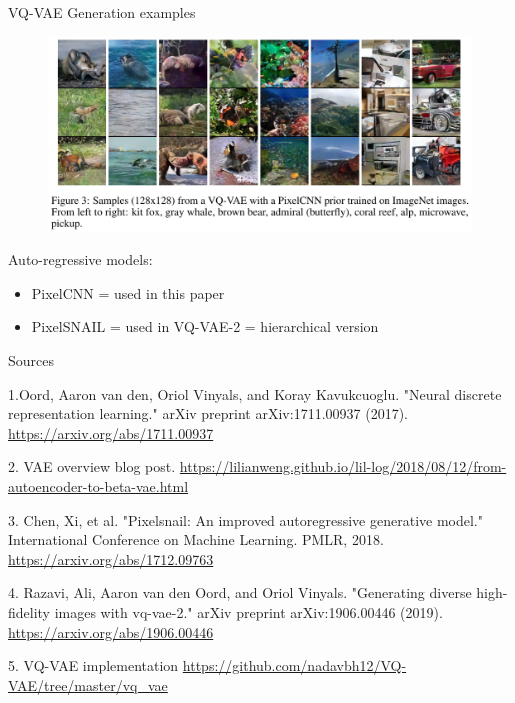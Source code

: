 \documentclass{beamer}
\begin{document}
\begin{frame}{VQ-VAE Generation examples}

\begin{figure}[h]
\includegraphics[width=\textwidth]{img/generated}
\end{figure}

Auto-regressive models:
\begin{itemize}
\item PixelCNN = used in this paper
\item PixelSNAIL \cite{snail} = used in VQ-VAE-2 = hierarchical version
\end{itemize}

\end{frame}

\begin{frame}{Sources}
\begin{thebibliography}{0}

   1.Oord, Aaron van den, Oriol Vinyals, and Koray Kavukcuoglu. "Neural discrete representation learning." arXiv preprint arXiv:1711.00937 (2017). \url{https://arxiv.org/abs/1711.00937} 
  
   2. VAE overview blog post. \url{https://lilianweng.github.io/lil-log/2018/08/12/from-autoencoder-to-beta-vae.html}
  
   3. Chen, Xi, et al. "Pixelsnail: An improved autoregressive generative model." International Conference on Machine Learning. PMLR, 2018. \url{https://arxiv.org/abs/1712.09763}
  
   4. Razavi, Ali, Aaron van den Oord, and Oriol Vinyals. "Generating diverse high-fidelity images with vq-vae-2." arXiv preprint arXiv:1906.00446 (2019). \url{https://arxiv.org/abs/1906.00446}
  
   5. VQ-VAE implementation \url{https://github.com/nadavbh12/VQ-VAE/tree/master/vq_vae}
  
\end{thebibliography}

\end{frame}

 
\end{document}
